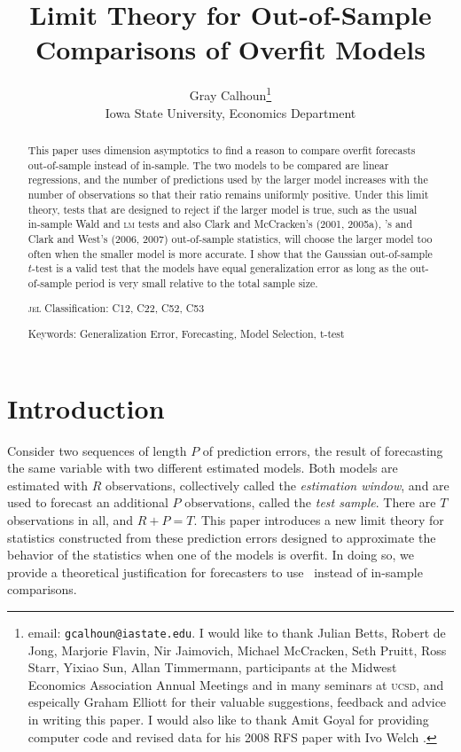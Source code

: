 \documentclass[11pt]{article}
\title{Limit Theory for Out-of-Sample Comparisons of Overfit Models}
\author{Gray Calhoun\thanks{email: \texttt{gcalhoun@iastate.edu}. I would like to thank
    Julian Betts, Robert de Jong, Marjorie Flavin, Nir Jaimovich,
    Michael McCracken, Seth Pruitt, Ross Starr, Yixiao Sun, Allan
    Timmermann, participants at the Midwest Economics Association
    Annual Meetings and in many seminars at \textsc{ucsd}, and espeically
    Graham Elliott for their valuable suggestions, feedback and advice in writing
    this paper.  I would also like to thank Amit Goyal for providing
    computer code and revised data for his 2008 RFS paper with Ivo
    Welch \citep{goyal-welch-2008-rfs}.} \\ Iowa State University, Economics Department}
\newcommand{\citepos}[1]{\citeauthor{#1}'s \citeyearpar{#1}}
\begin{document}

\maketitle

\begin{abstract}\noindent
  This paper uses dimension asymptotics to find a reason to compare
  overfit forecasts out-of-sample instead of in-sample. The two models
  to be compared are linear regressions, and the number of predictions
  used by the larger model increases with the number of observations
  so that their ratio remains uniformly positive. Under this limit
  theory, tests that are designed to reject if the larger model is
  true, such as the usual in-sample Wald and \textsc{lm} tests and
  also Clark and McCracken's (2001, 2005a),
  \citepos{mccracken_asymptotics_2007} and Clark and West's (2006,
  2007) out-of-sample statistics, will choose the larger model too
  often when the smaller model is more accurate. I show that the
  Gaussian out-of-sample $t$-test is a valid test that the models have
  equal generalization error as long as the out-of-sample period is
  very small relative to the total sample size.

\noindent \textsc{jel} Classification: C12, C22, C52, C53

\noindent Keywords: Generalization Error, Forecasting, Model
Selection, t-test
\end{abstract}

\section{Introduction}\label{sec:introduction}
Consider two sequences of length $P$ of prediction errors, the result
of forecasting the same variable with two different estimated models.
Both models are estimated with $R$ observations, collectively called
the {\em estimation window}, and are used to forecast an additional
$P$ observations, called the {\em test sample}.  There are $T$
observations in all, and $R+P=T$.  This paper introduces a new limit
theory for statistics constructed from these prediction errors
designed to approximate the behavior of the statistics when one of the
models is overfit.  In doing so, we provide a theoretical
justification for forecasters to use \oos\ instead of
in-sample comparisons.
\end{document}
